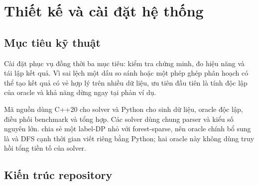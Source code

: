 \chapter{Thiết kế và cài đặt hệ thống}
\label{chap:implementation}

\section{Mục tiêu kỹ thuật}

Cài đặt phục vụ đồng thời ba mục tiêu: kiểm tra chứng minh, đo hiệu năng và tái lập kết quả. Vì sai lệch một dấu so sánh hoặc một phép ghép phân hoạch có thể tạo kết quả có vẻ hợp lý trên nhiều dữ liệu, ưu tiên đầu tiên là tính độc lập của oracle và khả năng dừng ngay tại phản ví dụ.

Mã nguồn dùng C++20 cho solver và Python cho sinh dữ liệu, oracle độc lập, điều phối benchmark và tổng hợp. Các solver dùng chung parser và kiểu số nguyên lớn.  chia sẻ một label-DP nhỏ với forest-sparse, nên oracle chính bổ sung là  và DFS cạnh thời gian viết riêng bằng Python; hai oracle này không dùng truy hồi tổng tiền tố của solver.

\section{Kiến trúc repository}

